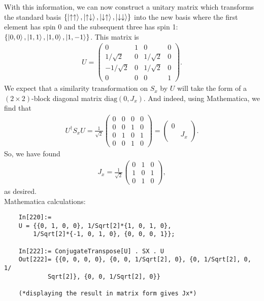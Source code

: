 \documentclass{article}
\theoremstyle{definition}
\newcommand{\f}[2]{\frac{#1}{#2}}
\begin{document}
With this information, we can now construct a unitary matrix which transforms the standard basis $\{\ket{\uparrow\uparrow}, \ket{\uparrow\downarrow}, \ket{\downarrow\uparrow}, \ket{\downarrow\downarrow}\}$ into the new basis where the first element has spin 0 and the subsequent three has spin 1: $\{ \ket{0,0}, \ket{1,1},\ket{1,0},\ket{1,-1} \}$. This matrix is 
\begin{align*}
	U = \begin{pmatrix}
		 0 & 1 & 0& 0\\
		 1/\sqrt{2} & 0 & 1/\sqrt{2}& 0\\
		-1/\sqrt{2} & 0 & 1/\sqrt{2}& 0\\
		 0 & 0 & 0& 1
	\end{pmatrix}.
\end{align*}
We expect that a similarity transformation on $S_x$ by $U$ will take the form of a $(2\times 2)$-block diagonal matrix  $\text{diag}(0,J_x)$. And indeed, using Mathematica, we find that
\begin{align*}
	U^\dagger S_x U = \f{1}{\sqrt{2}}\begin{pmatrix}
		0&0&0&0\\
		0&0&1&0\\
		0&1&0&1\\
		0&0&1&0
	\end{pmatrix} = \begin{pmatrix}
	0 & \\
	& J_x
\end{pmatrix}.
\end{align*}
So, we have found
\begin{align*}
		J_x = \f{1}{\sqrt{2}}\begin{pmatrix}
		0 &1 &0 \\ 
		1 &0 &1 \\
		0 &1 &0 
	\end{pmatrix}, 
\end{align*}
as desired. \\


Mathematica calculations:
\begin{lstlisting}
	In[220]:= 
	U = {{0, 1, 0, 0}, 1/Sqrt[2]*{1, 0, 1, 0}, 
		1/Sqrt[2]*{-1, 0, 1, 0}, {0, 0, 0, 1}};
	
	In[222]:= ConjugateTranspose[U] . SX . U
	Out[222]= {{0, 0, 0, 0}, {0, 0, 1/Sqrt[2], 0}, {0, 1/Sqrt[2], 0, 1/
			Sqrt[2]}, {0, 0, 1/Sqrt[2], 0}}
		
	(*displaying the result in matrix form gives Jx*)
\end{lstlisting}
\end{document}
